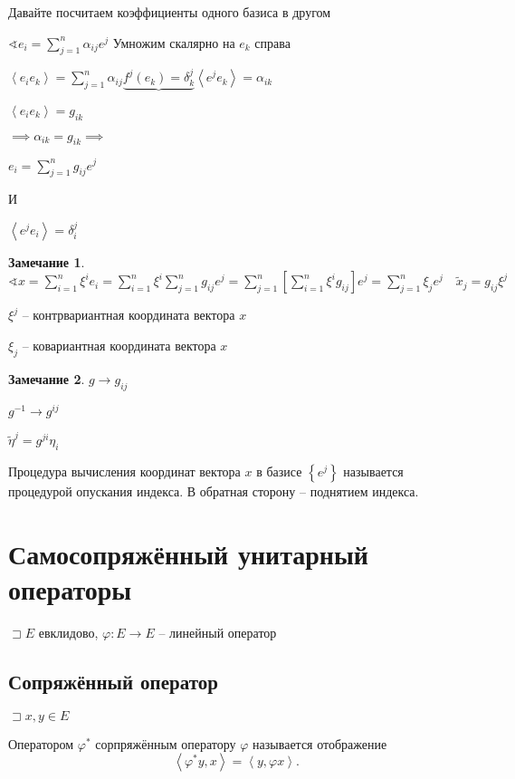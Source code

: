 \documentclass{book}
\newcommand{\tl}[1]{\widetilde{#1}}
\theoremstyle{definition}
\newtheorem*{note}{Замечание}
\begin{document}
Давайте посчитаем коэффициенты одного базиса в другом

$\sphericalangle e_i = \sum_{j=1}^{n} \alpha_{ij}e^j$ Умножим скалярно на $e_k$ справа

$\left<e_i e_k \right> = \sum_{j=1}^{n} \alpha_{ij}\underbrace{f^j(e_k) = \delta_k^j}{\left<e^je_k \right>} = \alpha_{ik}$ 

$\left<e_i e_k \right> = g_{ik}$

$\implies \alpha_{ik} = g_{ik} \implies$ 

$e_i = \sum_{j=1}^{n} g_{ij}e^j$ 

И

$\left<e^j e_i \right> = \delta_i^j$

\begin{note}
    $\sphericalangle x = \sum_{i=1}^{n} \xi^ie_i = \sum_{i=1}^{n} \xi^i \sum_{j=1}^{n} g_{ij}e^j = \sum_{j=1}^{n} \left[ \sum_{i=1}^{n} \xi^ig_{ij} \right] e^j = \sum_{j=1}^{n} \xi_je^j\quad \tl x_j = g_{ij}\xi^j$ 

    $\xi^j$ -- контрвариантная координата вектора  $x$

     $\xi_j$ -- ковариантная координата вектора  $x$
\end{note}

\begin{note}
    $g \to g_{ij}$

    $g^{-1} \to g^{ij}$

    $\tl \eta^j = g^{ji} \eta_i$
\end{note}

\begin{definition}
    Процедура вычисления координат вектора $x$ в базисе  $\left\{ e^j \right\} $ называется процедурой опускания индекса. В обратная сторону -- поднятием индекса.
\end{definition}

\section{Самосопряжённый унитарный операторы}

$\sqsupset E$  евклидово, $\varphi : E \to  E$ -- линейный оператор

\subsection{Сопряжённый оператор}

$\sqsupset x, y\in E $

\begin{definition}
    Оператором $\varphi^*$ сорпряжённым оператору  $\varphi$ называется отображение
     \[
    \left<\varphi^* y, x \right> = \left<y, \varphi x \right>
    .\] 
\end{definition}
\end{document}
